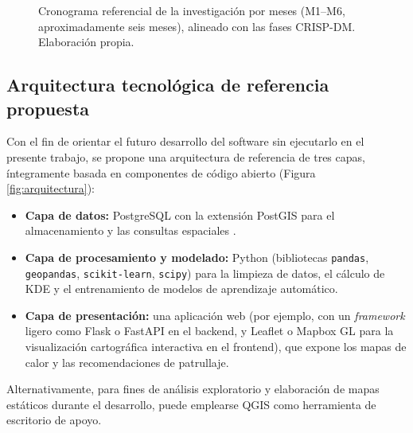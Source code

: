 \documentclass[12pt,letterpaper]{report}
\begin{document}
\begin{figure}[H]
\centering
{}
\caption[Cronograma referencial de la investigaci\'on]{Cronograma referencial de la investigaci\'on por meses (M1--M6, aproximadamente seis meses), alineado con las fases CRISP-DM. Elaboraci\'on propia.}
\label{fig:cronograma}
\end{figure}

\subsection{Arquitectura tecnol\'ogica de referencia propuesta}
Con el fin de orientar el futuro desarrollo del software sin ejecutarlo en el presente trabajo, se propone una arquitectura de referencia de tres capas, \'integramente basada en componentes de c\'odigo abierto (Figura \ref{fig:arquitectura}):
\begin{itemize}
    \item \textbf{Capa de datos:} PostgreSQL con la extensi\'on PostGIS para el almacenamiento y las consultas espaciales \citep{postgis2024}.
    \item \textbf{Capa de procesamiento y modelado:} Python (bibliotecas \texttt{pandas}, \texttt{geopandas}, \texttt{scikit-learn}, \texttt{scipy}) para la limpieza de datos, el c\'alculo de KDE y el entrenamiento de modelos de aprendizaje autom\'atico.
    \item \textbf{Capa de presentaci\'on:} una aplicaci\'on web (por ejemplo, con un \textit{framework} ligero como Flask o FastAPI en el backend, y Leaflet o Mapbox GL para la visualizaci\'on cartogr\'afica interactiva en el frontend), que expone los mapas de calor y las recomendaciones de patrullaje.
\end{itemize}
Alternativamente, para fines de an\'alisis exploratorio y elaboraci\'on de mapas est\'aticos durante el desarrollo, puede emplearse QGIS \citep{qgis2024} como herramienta de escritorio de apoyo.
\end{document}
